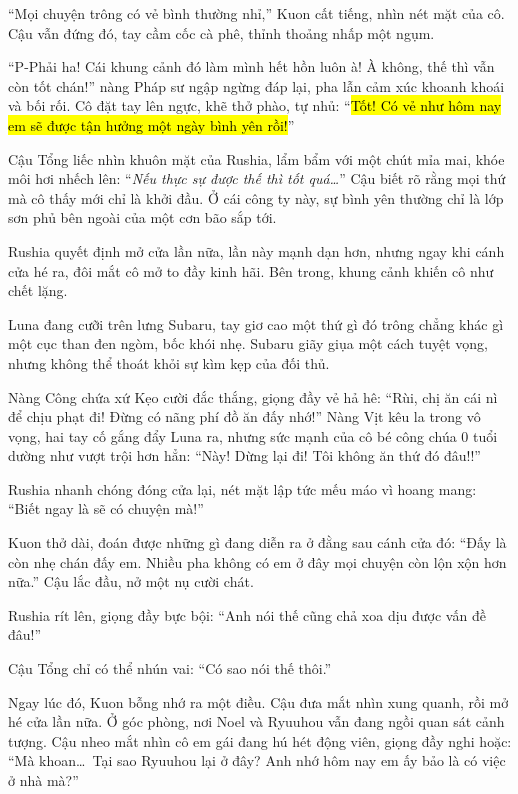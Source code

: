 \documentclass[../main.tex]{subfiles}
\begin{document}
``Mọi chuyện trông có vẻ bình thường nhỉ,'' Kuon cất tiếng, nhìn nét mặt của cô. Cậu vẫn đứng đó, tay cầm cốc cà phê, thỉnh thoảng nhấp một ngụm.

``P-Phải ha! Cái khung cảnh đó làm mình hết hồn luôn à! À không, thế thì vẫn còn tốt chán!'' nàng Pháp sư ngập ngừng đáp lại, pha lẫn cảm xúc khoanh khoái và bối rối. Cô đặt tay lên ngực, khẽ thở phào, tự nhủ: ``\hl{Tốt! Có vẻ như hôm nay em sẽ được tận hưởng một ngày bình yên rồi!}''

Cậu Tổng liếc nhìn khuôn mặt của Rushia, lẩm bẩm với một chút mỉa mai, khóe môi hơi nhếch lên: ``\textit{Nếu thực sự được thế thì tốt quá\dots}'' Cậu biết rõ rằng mọi thứ mà cô thấy mới chỉ là khởi đầu. Ở cái công ty này, sự bình yên thường chỉ là lớp sơn phủ bên ngoài của một cơn bão sắp tới.

Rushia quyết định mở cửa lần nữa, lần này mạnh dạn hơn, nhưng ngay khi cánh cửa hé ra, đôi mắt cô mở to đầy kinh hãi. Bên trong, khung cảnh khiến cô như chết lặng.

Luna đang cưỡi trên lưng Subaru, tay giơ cao một thứ gì đó trông chẳng khác gì một cục than đen ngòm, bốc khói nhẹ. Subaru giãy giụa một cách tuyệt vọng, nhưng không thể thoát khỏi sự kìm kẹp của đối thủ.


Nàng Công chứa xứ Kẹo cười đắc thắng, giọng đầy vẻ hả hê: ``Rùi, chị ăn cái nì để chịu phạt đi! Đừng có nãng phí đồ ăn đấy nhớ!'' Nàng Vịt kêu la trong vô vọng, hai tay cố gắng đẩy Luna ra, nhưng sức mạnh của cô bé công chúa 0 tuổi dường như vượt trội hơn hẳn: ``Này! Dừng lại đi! Tôi không ăn thứ đó đâu!!''

Rushia nhanh chóng đóng cửa lại, nét mặt lập tức mếu máo vì hoang mang: ``Biết ngay là sẽ có chuyện mà!''

Kuon thở dài, đoán được những gì đang diễn ra ở đằng sau cánh cửa đó: ``Đấy là còn nhẹ chán đấy em. Nhiều pha không có em ở đây mọi chuyện còn lộn xộn hơn nữa.'' Cậu lắc đầu, nở một nụ cười chát.

Rushia rít lên, giọng đầy bực bội: ``Anh nói thế cũng chả xoa dịu được vấn đề đâu!''

Cậu Tổng chỉ có thể nhún vai: ``Có sao nói thế thôi.''

Ngay lúc đó, Kuon bỗng nhớ ra một điều. Cậu đưa mắt nhìn xung quanh, rồi mở hé cửa lần nữa. Ở góc phòng, nơi Noel và Ryuuhou vẫn đang ngồi quan sát cảnh tượng. Cậu nheo mắt nhìn cô em gái đang hú hét động viên, giọng đầy nghi hoặc: ``Mà khoan\dots\ Tại sao Ryuuhou lại ở đây? Anh nhớ hôm nay em ấy bảo là có việc ở nhà mà?''
\end{document}

